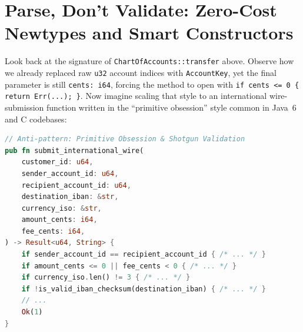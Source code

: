 \section{Parse, Don't Validate: Zero-Cost Newtypes and Smart Constructors}
\label{ch08:parse-dont-validate}

Look back at the signature of \texttt{ChartOfAccounts::transfer} above. Observe how we already replaced raw \texttt{u32} account indices with \texttt{AccountKey}, yet the final parameter is still \texttt{cents: i64}, forcing the method to open with \texttt{if cents <= 0 \{ return Err(...); \}}. Now imagine scaling that style to an international wire-submission function written in the ``primitive obsession'' style common in Java~6 and C codebases:

\begin{lstlisting}[language=Rust]
// Anti-pattern: Primitive Obsession & Shotgun Validation
pub fn submit_international_wire(
    customer_id: u64,
    sender_account_id: u64,
    recipient_account_id: u64,
    destination_iban: &str,
    currency_iso: &str,
    amount_cents: i64,
    fee_cents: i64,
) -> Result<u64, String> {
    if sender_account_id == recipient_account_id { /* ... */ }
    if amount_cents <= 0 || fee_cents < 0 { /* ... */ }
    if currency_iso.len() != 3 { /* ... */ }
    if !is_valid_iban_checksum(destination_iban) { /* ... */ }
    // ...
    Ok(1)
}
\end{lstlisting}

